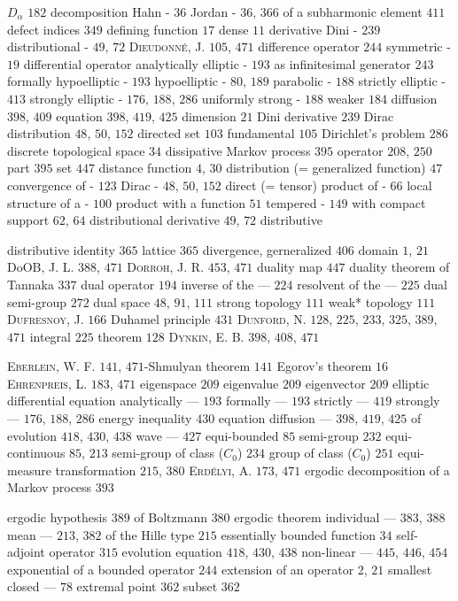 $D_{\alpha}$ $182$ decomposition Hahn - $36$ Jordan - $36$, $366$ of a subharmonic element $411$ defect indices $349$ defining function $17$ dense $11$ derivative Dini - $239$ distributional - $49$, $72$ \textsc{Dieudonné}, J. $105$, $471$ difference operator $244$ symmetric - $19$ differential operator analytically elliptic - $193$ as infinitesimal generator $243$ formally hypoelliptic - $193$ hypoelliptic - $80$, $189$ parabolic - $188$ strictly elliptic - $413$ strongly elliptic - $176$, $188$, $286$ uniformly strong - $188$ weaker $184$ diffusion $398$, $409$ equation $398$, $419$, $425$ dimension $21$ Dini derivative $239$ Dirac distribution $48$, $50$, $152$ directed set $103$ fundamental $105$ Dirichlet's problem $286$ discrete topological space $34$ dissipative Markov process $395$ operator $208$, $250$ part $395$ set $447$ distance function $4$, $30$ distribution (= generalized function) $47$ convergence of - $123$ Dirac - $48$, $50$, $152$ direct (= tensor) product of - $66$ local structure of a - $100$ product with a function $51$ tempered - $149$ with compact support $62$, $64$ distributional derivative $49$, $72$ distributive 

distributive identity $365$ lattice $365$ divergence, gerneralized $406$ domain $1$, $21$ DoOB, J. L. $388$, $471$ \textsc{Dorroh}, J. R. $453$, $471$ duality map $447$ duality theorem of Tannaka $337$ dual operator $194$ inverse of the --- $224$ resolvent of the --- $225$ dual semi-group $272$ dual space $48$, $91$, $111$ strong topology $111$ weak* topology $111$ \textsc{Dufresnoy}, J. $166$ Duhamel principle $431$ \textsc{Dunford}, N. $128$, $225$, $233$, $325$, $389$, $471$ integral $225$ theorem $128$ \textsc{Dynkin}, E. B. $398$, $408$, $471$

\textsc{Eberlein}, W. F. $141$, $471$-Shmulyan theorem $141$ Egorov's theorem $16$ \textsc{Ehrenpreis}, L. $183$, $471$ eigenspace $209$ eigenvalue $209$ eigenvector $209$ elliptic differential equation analytically --- $193$ formally --- $193$ strictly --- $419$ strongly --- $176$, $188$, $286$ energy inequality $430$ equation diffusion --- $398$, $419$, $425$ of evolution $418$, $430$, $438$ wave --- $427$ equi-bounded $85$ semi-group $232$ equi-continuous $85$, $213$ semi-group of class ($C_0$) $234$ group of class ($C_0$) $251$ equi-measure transformation $215$, $380$ \textsc{Erdélyi}, A. $173$, $471$ ergodic decomposition of a Markov process $393$ 

ergodic hypothesis $389$ of Boltzmann $380$ ergodic theorem individual --- $383$, $388$ mean --- $213$, $382$ of the Hille type $215$ essentially bounded function $34$ self-adjoint operator $315$ evolution equation $418$, $430$, $438$ non-linear --- $445$, $446$, $454$ exponential of a bounded operator $244$ extension of an operator $2$, $21$ smallest closed --- $78$ extremal point $362$ subset $362$

